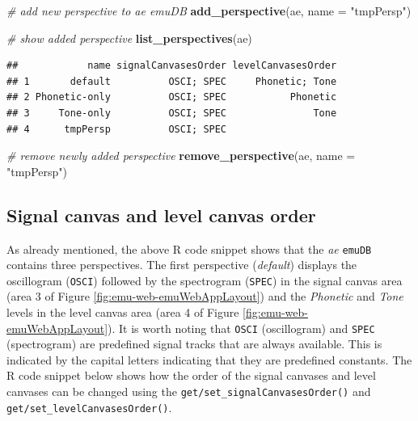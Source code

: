 \documentclass[]{book}
\newenvironment{Shaded}{\begin{snugshade}}{\end{snugshade}}
\newcommand{\CommentTok}[1]{\textcolor[rgb]{0.56,0.35,0.01}{\textit{#1}}}
\newcommand{\DataTypeTok}[1]{\textcolor[rgb]{0.13,0.29,0.53}{#1}}
\newcommand{\KeywordTok}[1]{\textcolor[rgb]{0.13,0.29,0.53}{\textbf{#1}}}
\newcommand{\NormalTok}[1]{#1}
\newcommand{\StringTok}[1]{\textcolor[rgb]{0.31,0.60,0.02}{#1}}
\begin{document}
\begin{Shaded}
\begin{Highlighting}[]
\CommentTok{# add new perspective to ae emuDB}
\KeywordTok{add_perspective}\NormalTok{(ae,}
                \DataTypeTok{name =} \StringTok{"tmpPersp"}\NormalTok{)}

\CommentTok{# show added perspective}
\KeywordTok{list_perspectives}\NormalTok{(ae)}
\end{Highlighting}
\end{Shaded}

\begin{verbatim}
##            name signalCanvasesOrder levelCanvasesOrder
## 1       default          OSCI; SPEC     Phonetic; Tone
## 2 Phonetic-only          OSCI; SPEC           Phonetic
## 3     Tone-only          OSCI; SPEC               Tone
## 4      tmpPersp          OSCI; SPEC
\end{verbatim}

\begin{Shaded}
\begin{Highlighting}[]
\CommentTok{# remove newly added perspective}
\KeywordTok{remove_perspective}\NormalTok{(ae,}
                   \DataTypeTok{name =} \StringTok{"tmpPersp"}\NormalTok{)}
\end{Highlighting}
\end{Shaded}

\hypertarget{signal-canvas-and-level-canvas-order}{%
\subsection{Signal canvas and level canvas order}\label{signal-canvas-and-level-canvas-order}}

As already mentioned, the above R code snippet shows that the \emph{ae} \texttt{emuDB} contains three perspectives. The first perspective (\emph{default}) displays the oscillogram (\texttt{OSCI}) followed by the spectrogram (\texttt{SPEC}) in the signal canvas area (area 3 of Figure \ref{fig:emu-web-emuWebAppLayout}) and the \emph{Phonetic} and \emph{Tone} levels in the level canvas area (area 4 of Figure \ref{fig:emu-web-emuWebAppLayout}). It is worth noting that \texttt{OSCI} (oscillogram) and \texttt{SPEC} (spectrogram) are predefined signal tracks that are always available. This is indicated by the capital letters indicating that they are predefined constants. The R code snippet below shows how the order of the signal canvases and level canvases can be changed using the \texttt{get/set\_signalCanvasesOrder()} and \texttt{get/set\_levelCanvasesOrder()}.
\end{document}

